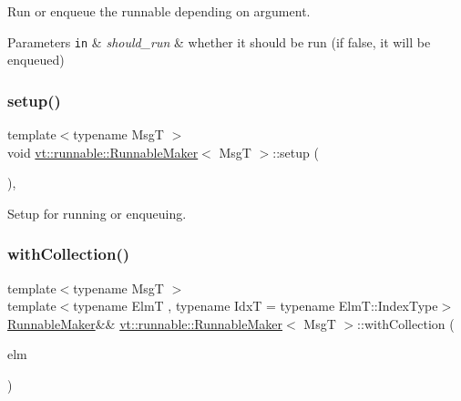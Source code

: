 Run or enqueue the runnable depending on argument. 


\begin{DoxyParams}[1]{Parameters}
\mbox{\tt in}  & {\em should\+\_\+run} & whether it should be run (if false, it will be enqueued) \\
\hline
\end{DoxyParams}
\mbox{\label{structvt_1_1runnable_1_1_runnable_maker_add114dad8a3f0769bed8b8396ba9a13a}} 
\subsubsection{\texorpdfstring{setup()}{setup()}}
{\footnotesize\ttfamily template$<$typename MsgT $>$ \\
void \hyperlink{structvt_1_1runnable_1_1_runnable_maker}{vt\+::runnable\+::\+Runnable\+Maker}$<$ MsgT $>$\+::setup (\begin{DoxyParamCaption}{ }\end{DoxyParamCaption})\hspace{0.3cm}{\ttfamily [inline]}, {\ttfamily [private]}}



Setup for running or enqueuing. 

\mbox{\label{structvt_1_1runnable_1_1_runnable_maker_aed99a9b0607da59ab7ad7ee56255fcc8}} 
\subsubsection{\texorpdfstring{with\+Collection()}{withCollection()}}
{\footnotesize\ttfamily template$<$typename MsgT $>$ \\
template$<$typename ElmT , typename IdxT  = typename Elm\+T\+::\+Index\+Type$>$ \\
\hyperlink{structvt_1_1runnable_1_1_runnable_maker}{Runnable\+Maker}\&\& \hyperlink{structvt_1_1runnable_1_1_runnable_maker}{vt\+::runnable\+::\+Runnable\+Maker}$<$ MsgT $>$\+::with\+Collection (\begin{DoxyParamCaption}\item[{ElmT $\ast$}]{elm }\end{DoxyParamCaption})\hspace{0.3cm}{\ttfamily [inline]}}




